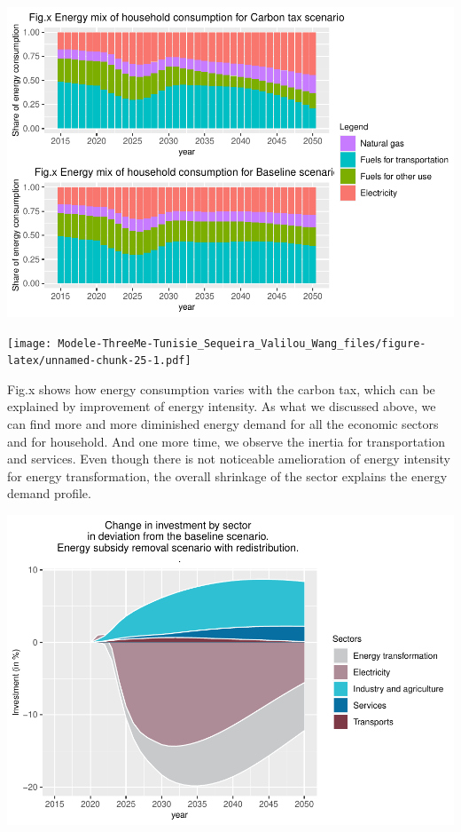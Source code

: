 \documentclass[
]{article}
\begin{document}
\includegraphics{Modele-ThreeMe-Tunisie_Sequeira_Valilou_Wang_files/figure-latex/unnamed-chunk-24-1.pdf}

\texttt{[image: Modele-ThreeMe-Tunisie\_Sequeira\_Valilou\_Wang\_files/figure-latex/unnamed-chunk-25-1.pdf]}

Fig.x shows how energy consumption varies with the carbon tax, which can
be explained by improvement of energy intensity. As what we discussed
above, we can find more and more diminished energy demand for all the
economic sectors and for household. And one more time, we observe the
inertia for transportation and services. Even though there is not
noticeable amelioration of energy intensity for energy transformation,
the overall shrinkage of the sector explains the energy demand profile.

\includegraphics{Modele-ThreeMe-Tunisie_Sequeira_Valilou_Wang_files/figure-latex/unnamed-chunk-26-1.pdf}
\end{document}
